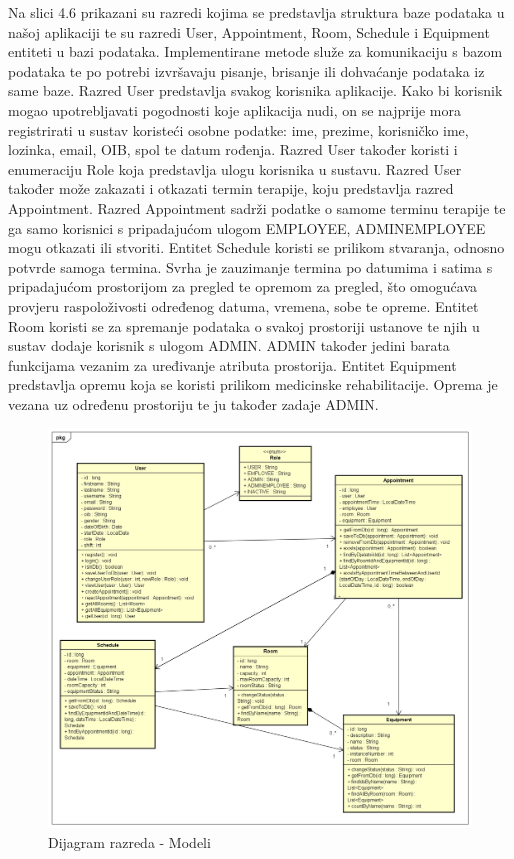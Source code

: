 			Na slici 4.6 prikazani su razredi kojima se predstavlja struktura baze podataka u našoj aplikaciji te su razredi User, Appointment, Room, Schedule i Equipment entiteti u bazi podataka. Implementirane metode služe za komunikaciju s bazom podataka te po potrebi izvršavaju pisanje, brisanje ili dohvaćanje podataka iz same baze. Razred User predstavlja svakog korisnika aplikacije. Kako bi korisnik mogao upotrebljavati pogodnosti koje aplikacija nudi, on se najprije mora registrirati u sustav koristeći osobne podatke: ime, prezime, korisničko ime, lozinka, email, OIB, spol te datum rođenja. Razred User također koristi i enumeraciju Role koja predstavlja ulogu korisnika u sustavu. Razred User također može zakazati i otkazati termin terapije, koju predstavlja razred Appointment. Razred Appointment sadrži podatke o samome terminu terapije te ga samo korisnici s pripadajućom ulogom EMPLOYEE, ADMINEMPLOYEE mogu otkazati ili stvoriti. Entitet Schedule koristi se prilikom stvaranja, odnosno potvrde samoga termina. Svrha je zauzimanje termina po datumima i satima s pripadajućom prostorijom za pregled te opremom za pregled, što omogućava provjeru raspoloživosti određenog datuma, vremena, sobe te opreme. Entitet Room koristi se za spremanje podataka o svakoj prostoriji ustanove te njih u sustav dodaje korisnik s ulogom ADMIN. ADMIN također jedini barata funkcijama vezanim za uređivanje atributa prostorija. Entitet Equipment predstavlja opremu koja se koristi prilikom medicinske rehabilitacije. Oprema je vezana uz određenu prostoriju te ju također zadaje ADMIN.
		
			\begin{figure}[H]
				\includegraphics[scale=0.45]{slike/modeli_v2}
				\centering
				\caption{Dijagram razreda - Modeli}
			\end{figure}
			
